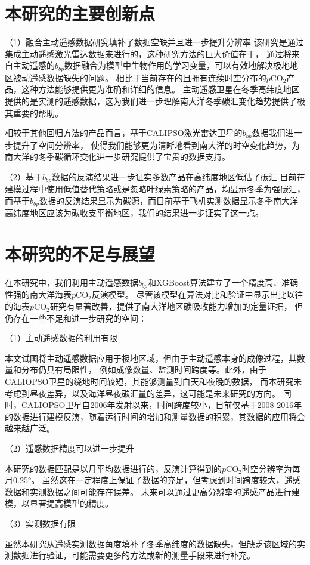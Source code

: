 \section{本研究的主要创新点}
（1）融合主动遥感数据研究填补了数据空缺并且进一步提升分辨率
该研究是通过集成主动遥感激光雷达数据来进行的，这种研究方法的巨大价值在于，
通过将来自主动遥感的$b_{bp}$数据融合为模型中生物作用的学习变量，可以有效地解决极地地区被动遥感数据缺失的问题。
相比于当前存在的且拥有连续时空分布的$p\mathrm{CO_2}$产品，这种方法能够提供更为准确和详细的信息。
主动遥感卫星在冬季高纬度地区提供的是实测的遥感数据，这为我们进一步理解南大洋冬季碳汇变化趋势提供了极其重要的帮助。

相较于其他回归方法的产品而言，基于CALIPSO激光雷达卫星的$b_{bp}$数据我们进一步提升了空间分辨率，
使得我们能够更为清晰地看到南大洋的时空变化趋势，为南大洋的冬季碳循环变化进一步研究提供了宝贵的数据支持。


（2）基于$b_{bp}$数据的反演结果进一步证实多数产品在高纬度地区低估了碳汇
目前在建模过程中使用低值替代策略或是忽略叶绿素策略的产品，均显示冬季为强碳汇，而基于$b_{bp}$数据的反演结果显示为碳源，而目前基于飞机实测数据显示冬季南大洋高纬度地区应该为碳收支平衡地区，我们的结果进一步证实了这一点。

\section{本研究的不足与展望}
在本研究中，我们利用主动遥感数据$b_{bp}$和XGBoost算法建立了一个精度高、准确性强的南大洋海表$p\mathrm{CO_2}$反演模型。
尽管该模型在算法对比和验证中显示出比以往的海表$p\mathrm{CO_2}$研究有显著改善，提供了南大洋地区碳吸收能力增加的定量证据，
但仍存在一些不足和进一步研究的空间：

（1）主动遥感数据的利用有限

本文试图将主动遥感数据应用于极地区域，但由于主动遥感本身的成像过程，其数量和分布仍具有局限性，
例如成像数量、监测时间跨度等。此外，由于CALIOPSO卫星的绕地时间较短，其能够测量到白天和夜晚的数据，
而本研究未考虑到昼夜差异，以及海洋昼夜碳汇量的差异，这可能是未来研究的方向。
同时，CALIOPSO卫星自2006年发射以来，时间跨度较小，目前仅基于2008-2016年的数据进行建模反演，随着运行时间的增加和测量数据的积累，其数据的应用将会越来越广泛。

（2）遥感数据精度可以进一步提升

本研究的数据匹配是以月平均数据进行的，反演计算得到的$p\mathrm{CO_2}$时空分辨率为每月0.25°。
虽然这在一定程度上保证了数据的充足，但考虑到时间跨度较大，遥感数据和实测数据之间可能存在误差。
未来可以通过更高分辨率的遥感产品进行建模，以显著提高模型的精度。

（3）实测数据有限

虽然本研究从遥感实测数据角度填补了冬季高纬度的数据缺失，但缺乏该区域的实测数据进行验证，可能需要更多的方法或新的测量手段来进行补充。






